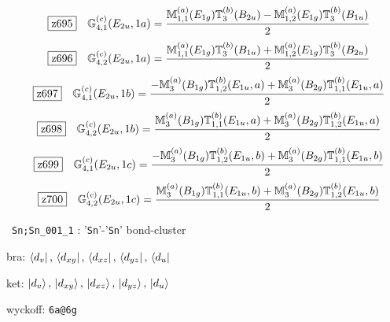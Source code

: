 \documentclass[fleqn,10pt,landscape]{jsarticle}
\begin{document}
\begin{dmath*}
\hspace*{3mm}\fbox{z695}\quad \mathbb{G}_{4,1}^{(c)}(E_{2u},1a)=\frac{\mathbb{M}_{1,1}^{(a)}(E_{1g}) \mathbb{T}_{3}^{(b)}(B_{2u}) - \mathbb{M}_{1,2}^{(a)}(E_{1g}) \mathbb{T}_{3}^{(b)}(B_{1u})}{2}
\end{dmath*}
\begin{dmath*}
\hspace*{3mm}\fbox{z696}\quad \mathbb{G}_{4,2}^{(c)}(E_{2u},1a)=\frac{\mathbb{M}_{1,1}^{(a)}(E_{1g}) \mathbb{T}_{3}^{(b)}(B_{1u}) + \mathbb{M}_{1,2}^{(a)}(E_{1g}) \mathbb{T}_{3}^{(b)}(B_{2u})}{2}
\end{dmath*}
\begin{dmath*}
\hspace*{3mm}\fbox{z697}\quad \mathbb{G}_{4,1}^{(c)}(E_{2u},1b)=\frac{- \mathbb{M}_{3}^{(a)}(B_{1g}) \mathbb{T}_{1,2}^{(b)}(E_{1u},a) + \mathbb{M}_{3}^{(a)}(B_{2g}) \mathbb{T}_{1,1}^{(b)}(E_{1u},a)}{2}
\end{dmath*}
\begin{dmath*}
\hspace*{3mm}\fbox{z698}\quad \mathbb{G}_{4,2}^{(c)}(E_{2u},1b)=\frac{\mathbb{M}_{3}^{(a)}(B_{1g}) \mathbb{T}_{1,1}^{(b)}(E_{1u},a) + \mathbb{M}_{3}^{(a)}(B_{2g}) \mathbb{T}_{1,2}^{(b)}(E_{1u},a)}{2}
\end{dmath*}
\begin{dmath*}
\hspace*{3mm}\fbox{z699}\quad \mathbb{G}_{4,1}^{(c)}(E_{2u},1c)=\frac{- \mathbb{M}_{3}^{(a)}(B_{1g}) \mathbb{T}_{1,2}^{(b)}(E_{1u},b) + \mathbb{M}_{3}^{(a)}(B_{2g}) \mathbb{T}_{1,1}^{(b)}(E_{1u},b)}{2}
\end{dmath*}
\begin{dmath*}
\hspace*{3mm}\fbox{z700}\quad \mathbb{G}_{4,2}^{(c)}(E_{2u},1c)=\frac{\mathbb{M}_{3}^{(a)}(B_{1g}) \mathbb{T}_{1,1}^{(b)}(E_{1u},b) + \mathbb{M}_{3}^{(a)}(B_{2g}) \mathbb{T}_{1,2}^{(b)}(E_{1u},b)}{2}
\end{dmath*}
\vspace{5mm}

\noindent\textbullet\, \texttt{Sn;Sn_001_1} : '\texttt{Sn}'-'\texttt{Sn}' bond-cluster

\noindent\quad * bra: $\bra{d_{v}},\, \bra{d_{xy}},\, \bra{d_{xz}},\, \bra{d_{yz}},\, \bra{d_{u}}$

\noindent\quad * ket: $\ket{d_{v}},\, \ket{d_{xy}},\, \ket{d_{xz}},\, \ket{d_{yz}},\, \ket{d_{u}}$

\noindent\quad * wyckoff: \texttt{6a@6g}
\end{document}
